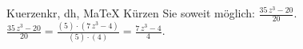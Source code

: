 \begin{MAufgabe}{Kuerzen}{kr, dh, MaTeX}
K\"urzen Sie soweit m\"oglich: $\frac{35\, z^3 - 20}{20}$.\\ 
\ifLsg\MLoesung
\quad $\frac{35\, z^3 - 20}{20}=\frac{(5)\cdot(7\, z^3 - 4)}{(5)\cdot(4)}=\frac{7\, z^3 - 4}{4}$.\else\relax\fi
 \end{MAufgabe}